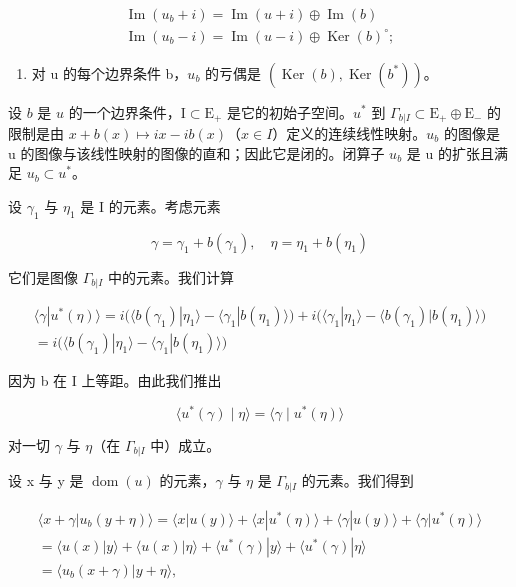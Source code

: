 \[
\begin{array}{l} \operatorname{Im} (u _ {b} + i) = \operatorname{Im} (u + i) \oplus \operatorname{Im} (b) \\ \operatorname{Im} (u _ {b} - i) = \operatorname{Im} (u - i) \oplus \operatorname{Ker} (b) ^ {\circ}; \end{array}
\]

\begin{enumerate}
\def\labelenumi{\alph{enumi})}
\setcounter{enumi}{3}
\tightlist
\item
  对 u 的每个边界条件 b，\(u_{b}\) 的亏偶是 \((\operatorname{Ker}(b), \operatorname{Ker}(b^{*}))\)。
\end{enumerate}

设 \(b\) 是 \(u\) 的一个边界条件，\(\mathrm{I} \subset \mathrm{E}_{+}\) 是它的初始子空间。\(u^{*}\) 到 \(\Gamma_{b|I} \subset \mathrm{E}_{+} \oplus \mathrm{E}_{-}\) 的限制是由 \(x + b(x) \mapsto ix - ib(x)\)（\(x \in I\)）定义的连续线性映射。\(u_{b}\) 的图像是 u 的图像与该线性映射的图像的直和；因此它是闭的。闭算子 \(u_{b}\) 是 u 的扩张且满足 \(u_{b} \subset u^{*}\)。

设 \(\gamma_{1}\) 与 \(\eta_{1}\) 是 I 的元素。考虑元素

\[
\gamma = \gamma_ {1} + b (\gamma_ {1}), \quad \eta = \eta_ {1} + b (\eta_ {1})
\]

它们是图像 \(\Gamma_{b|I}\) 中的元素。我们计算

\[
\begin{array}{c} \langle \gamma | u ^ {*} (\eta) \rangle = i \big (\langle b (\gamma_ {1}) | \eta_ {1} \rangle - \langle \gamma_ {1} | b (\eta_ {1}) \rangle \big) + i \big (\langle \gamma_ {1} | \eta_ {1} \rangle - \langle b (\gamma_ {1}) | b (\eta_ {1}) \rangle \big) \\ = i \big (\langle b (\gamma_ {1}) | \eta_ {1} \rangle - \langle \gamma_ {1} | b (\eta_ {1}) \rangle \big) \end{array}
\]

因为 b 在 I 上等距。由此我们推出

\[
\langle u ^ {*} (\gamma) \mid \eta \rangle = \langle \gamma \mid u ^ {*} (\eta) \rangle\tag{12}
\]

对一切 \(\gamma\) 与 \(\eta\)（在 \(\Gamma_{b|I}\) 中）成立。

设 x 与 y 是 \(\operatorname{dom}(u)\) 的元素，\(\gamma\) 与 \(\eta\) 是 \(\Gamma_{b|I}\) 的元素。我们得到

\[
\begin{array}{c} \langle x + \gamma | u _ {b} (y + \eta) \rangle = \langle x | u (y) \rangle + \langle x | u ^ {*} (\eta) \rangle + \langle \gamma | u (y) \rangle + \langle \gamma | u ^ {*} (\eta) \rangle \\ = \langle u (x) | y \rangle + \langle u (x) | \eta \rangle + \langle u ^ {*} (\gamma) | y \rangle + \langle u ^ {*} (\gamma) | \eta \rangle \\ = \langle u _ {b} (x + \gamma) | y + \eta \rangle , \end{array}
\]

